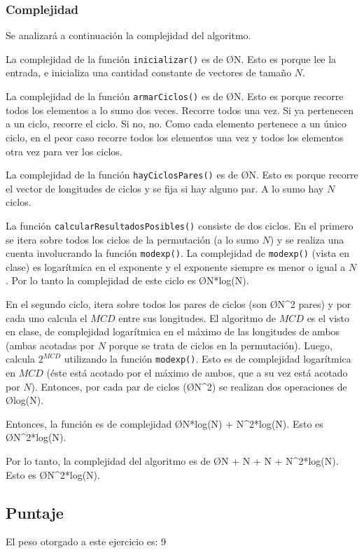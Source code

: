 \subsubsection{Complejidad}

Se analizará a continuación la complejidad del algoritmo.

La complejidad de la función \texttt{inicializar()} es de \O{N}. Esto es porque lee la entrada, e inicializa una cantidad constante de vectores de tamaño $N$.

La complejidad de la función \texttt{armarCiclos()} es de \O{N}. Esto es porque recorre todos los elementos a lo sumo dos veces. Recorre todos una vez. Si ya pertenecen a un ciclo, recorre el ciclo. Si no, no. Como cada elemento pertenece a un único ciclo, en el peor caso recorre todos los elementos una vez y todos los elementos otra vez para ver los ciclos.

La complejidad de la función \texttt{hayCiclosPares()} es de \O{N}. Esto es porque recorre el vector de longitudes de ciclos y se fija si hay alguno par. A lo sumo hay $N$ ciclos.

La función \texttt{calcularResultadosPosibles()} consiste de dos ciclos. En el primero se itera sobre todos los ciclos de la permutación (a lo sumo $N$) y se realiza una cuenta involucrando la función \texttt{modexp()}. La complejidad de \texttt{modexp()} (vista en clase) es logarítmica en el exponente y el exponente siempre es menor o igual a $N$. Por lo tanto la complejidad de este ciclo es \O{N*log(N)}.

En el segundo ciclo, itera sobre todos los pares de ciclos (son \O{N^2} pares) y por cada uno calcula el $MCD$ entre sus longitudes. El algoritmo de $MCD$ es el visto en clase, de complejidad logarítmica en el máximo de las longitudes de ambos (ambas acotadas por $N$ porque se trata de ciclos en la permutación).
Luego, calcula $2^{MCD}$ utilizando la función \texttt{modexp()}. Esto es de complejidad logarítmica en $MCD$ (éste está acotado por el máximo de ambos, que a su vez está acotado por $N$). Entonces, por cada par de ciclos (\O{N^2}) se realizan dos operaciones de \O{log(N)}.

Entonces, la función es de complejidad \O{N*log(N) + N^2*log(N)}. Esto es \O{N^2*log(N)}.

Por lo tanto, la complejidad del algoritmo es de \O{N + N + N + N^2*log(N)}. Esto es \O{N^2*log(N)}.

\subsection{Puntaje}
El peso otorgado a este ejercicio es: 9
